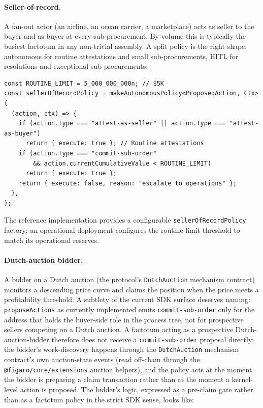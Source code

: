 \documentclass[11pt,a4paper]{article}
\theoremstyle{definition}
\theoremstyle{remark}
\begin{document}
\paragraph{Seller-of-record.}
A fan-out actor (an airline, an ocean carrier, a marketplace)
acts as seller to the buyer and as buyer at every sub-procurement.
By volume this is typically the busiest factotum in any non-trivial
assembly. A split policy is the right shape: autonomous for routine
attestations and small sub-procurements, HITL for resolutions and
exceptional sub-procurements:

\begin{lstlisting}
const ROUTINE_LIMIT = 5_000_000_000n; // $5K
const sellerOfRecordPolicy = makeAutonomousPolicy<ProposedAction, Ctx>(
  (action, ctx) => {
    if (action.type === "attest-as-seller" || action.type === "attest-as-buyer")
      return { execute: true }; // Routine attestations
    if (action.type === "commit-sub-order"
        && action.currentCumulativeValue < ROUTINE_LIMIT)
      return { execute: true };
    return { execute: false, reason: "escalate to operations" };
  },
);
\end{lstlisting}

The reference implementation provides a configurable
\texttt{sellerOfRecordPolicy} factory; an operational deployment
configures the routine-limit threshold to match its operational
reserves.

\paragraph{Dutch-auction bidder.}
A bidder on a Dutch auction (the protocol's
\texttt{DutchAuction} mechanism contract) monitors a descending
price curve and claims the position when the price meets a
profitability threshold. A subtlety of the current SDK surface
deserves naming: \texttt{proposeActions} as currently implemented
emits \texttt{commit-sub-order} only for the address that holds
the buyer-side role in the process tree, not for prospective
sellers competing on a Dutch auction. A factotum acting as a
prospective Dutch-auction-bidder therefore does not receive a
\texttt{commit-sub-order} proposal directly; the bidder's
work-discovery happens through the \texttt{DutchAuction} mechanism
contract's own auction-state events (read off-chain through the
\texttt{@figaro/core/extensions} auction helpers), and the policy
acts at the moment the bidder is preparing a claim transaction
rather than at the moment a kernel-level action is proposed. The
bidder's logic, expressed as a pre-claim gate rather than as a
factotum policy in the strict SDK sense, looks like:
\end{document}
